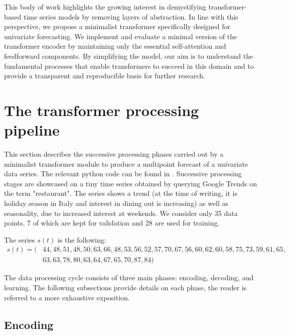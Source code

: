 \documentclass[algorithms,article,submit,pdftex,moreauthors]{Definitions/mdpi}
\begin{document}
This body of work highlights the growing interest in demystifying transformer-based time series models by removing layers of abstraction. In line with this perspective, we propose a minimalist transformer specifically designed for univariate forecasting. We implement and evaluate a minimal version of the transformer encoder by maintaining only the essential self-attention and feedforward components. By simplifying the model, our aim is to understand the fundamental processes that enable transformers to succeed in this domain and to provide a transparent and reproducible basis for further research.


\section{The transformer processing pipeline} \label{sec:transformer}

This section describes the successive processing phases carried out by a minimalist transformer module to produce a multipoint forecast of a univariate data series. The relevant python code can be found in \cite{G25}. Successive processing stages are showcased on a tiny time series obtained by querying Google Trends \cite{googletrends2025} on the term "restaurant". The series shows a trend (at the time of writing, it is holiday season in Italy and interest in dining out is increasing) as well as seasonality, due to increased interest at weekends. We consider only 35 data points, 7 of which are kept for validation and 28 are used for training.

The series $s(t)$ is the following:
\begin{align}
s(t) = (& 44, 48, 51, 48, 50, 63, 66, 48, 53, 56, 52, 57, 70, 67, 56, 60, 62, 60, 58, 75, 73, 59, 61, 65,\nonumber\\
        & 63, 63, 78, 80, 63, 64, 67, 65, 70, 87, 84)\nonumber
\end{align}

The data processing cycle consists of three main phases: encoding, decoding, and learning. The following subsections provide details on each phase, the reader is referred to \cite{VSPU17} a more exhaustive exposition.

\subsection{Encoding} \label{subsec:encoding}
\end{document}
